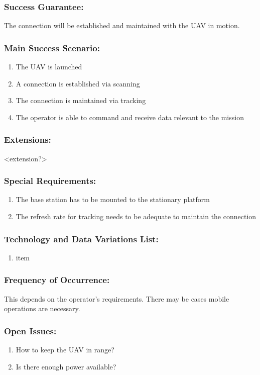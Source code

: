 \documentclass[ProductRequirements.tex]{subfiles}
\begin{document}
	\subsubsection*{Success Guarantee:}
	The connection will be established and maintained with the UAV in motion.
	\subsubsection*{Main Success Scenario:}
	\begin{enumerate}\itemsep1pt
		\item The UAV is launched
		\item A connection is established via scanning
		\item The connection is maintained via tracking
		\item The operator is able to command and receive data relevant to the mission 
	\end{enumerate}
	\subsubsection*{Extensions:}
	<extension?>
	\subsubsection*{Special Requirements:}
	\begin{enumerate}\itemsep1pt
		\item The base station has to be mounted to the stationary platform
		\item The refresh rate for tracking needs to be adequate to maintain the connection
	\end{enumerate}
	\subsubsection*{Technology and Data Variations List:}
	\begin{enumerate}\itemsep1pt
		\item item
	\end{enumerate}
	\subsubsection*{Frequency of Occurrence:}
	This depends on the operator's requirements. There may be cases mobile operations are necessary.
	\subsubsection*{Open Issues:}
	\begin{enumerate}\itemsep1pt
		\item How to keep the UAV in range?
		\item Is there enough power available?
	\end{enumerate}		

		
\end{document}
